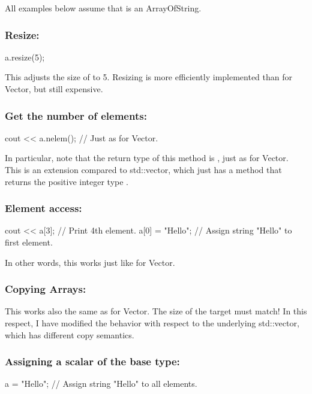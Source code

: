 All examples below assume that  is an ArrayOfString.

\subsubsection{Resize:}
\begin{code}
a.resize(5);
\end{code}

This adjusts the size of  to 5. Resizing is more efficiently
implemented than for Vector, but still expensive.

\subsubsection{Get the number of elements:}
\begin{code}
cout << a.nelem();  // Just as for Vector.
\end{code}

In particular, note that the return type of this method is
, just as for Vector. This is an extension compared to
std::vector, which just has a method  that returns the
positive integer type .

\subsubsection{Element access:}
\begin{code}
cout << a[3];   // Print 4th element.
a[0] = "Hello"; // Assign string "Hello" to first element.
\end{code}

In other words, this works just like for Vector.

\subsubsection{Copying Arrays:}

This works also the same as for Vector. The size of the target must
match! In this respect, I have modified the behavior with respect to
the underlying std::vector, which has different copy semantics.

\subsubsection{Assigning a scalar of the base type:}
\begin{code}
a = "Hello";    // Assign string "Hello" to all elements.
\end{code}

